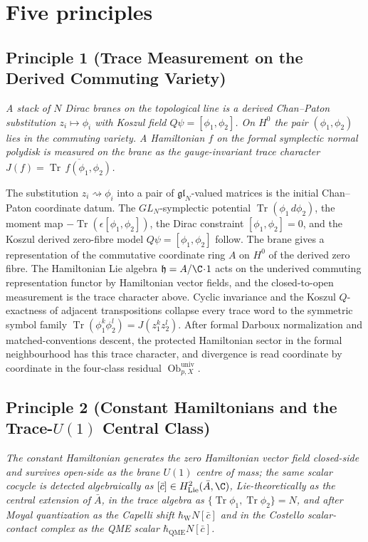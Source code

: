 \section*{Five principles}\label{sec:organizing-principles}

\subsection*{Principle 1 (Trace Measurement on the Derived Commuting Variety)}

\emph{A stack of \(N\) Dirac branes on the topological line is a
derived Chan--Paton substitution \(z_i\mapsto\phi_i\) with Koszul
field \(Q\psi=[\phi_1,\phi_2]\).  On \(H^0\) the pair
\((\phi_1,\phi_2)\) lies in the commuting variety.  A Hamiltonian
\(f\) on the formal symplectic normal polydisk is measured on the
brane as the gauge-invariant trace character
\(J(f)=\overline{\operatorname{Tr}\,f(\phi_1,\phi_2)}\).}

The substitution \(z_i\rightsquigarrow\phi_i\) into a pair of
\(\mathfrak{gl}_N\)-valued matrices is the initial Chan--Paton
coordinate datum.  The
\(GL_N\)-symplectic potential \(\operatorname{Tr}(\phi_1\,d\phi_2)\),
the moment map \(-\operatorname{Tr}(\epsilon[\phi_1,\phi_2])\), the
Dirac constraint \([\phi_1,\phi_2]=0\), and the Koszul derived
zero-fibre model \(Q\psi=[\phi_1,\phi_2]\) follow.  The brane gives a
representation of the commutative coordinate ring \(A\) on \(H^0\) of
the derived zero fibre.  The Hamiltonian Lie algebra
\(\mathfrak h=A/\C\!\cdot\!1\) acts on the underived commuting
representation functor by Hamiltonian vector fields, and the
closed-to-open measurement is the trace character above.  Cyclic
invariance and the Koszul \(Q\)-exactness of adjacent transpositions collapse every trace
word to the symmetric symbol family
\(\operatorname{Tr}(\phi_1^k\phi_2^l)=J(z_1^kz_2^l)\).  After formal
Darboux normalization and matched-conventions descent, the protected
Hamiltonian sector in the formal neighbourhood has this trace
character, and divergence is read coordinate by coordinate in the
four-class
residual \(\operatorname{Ob}^{\mathrm{univ}}_{p,X}\).

\subsection*{Principle 2 (Constant Hamiltonians and the Trace-\(U(1)\) Central Class)}

\emph{The constant Hamiltonian generates the zero Hamiltonian vector
field closed-side and survives open-side as the brane \(U(1)\)
centre of mass; the same scalar cocycle is detected algebraically as
\([\bar c]\in H^2_{\mathrm{Lie}}(\bar A,\C)\), Lie-theoretically as the
central extension of \(\bar A\), in the trace algebra as
\(\{\operatorname{Tr}\phi_1,\operatorname{Tr}\phi_2\}=N\), and after
Moyal quantization as the Capelli shift
\(\hbar_{\mathrm{W}}N[\bar c]\) and in the Costello scalar-contact
complex as the QME scalar \(\hbar_{\mathrm{QME}}N[\bar c]\).}

